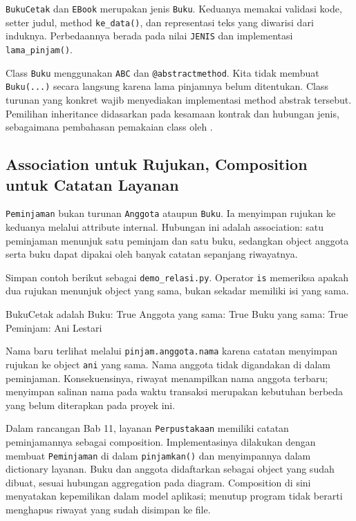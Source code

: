 \texttt{BukuCetak} dan \texttt{EBook} merupakan jenis \texttt{Buku}. Keduanya memakai validasi kode, setter judul, method \texttt{ke\_data()}, dan representasi teks yang diwarisi dari induknya. Perbedaannya berada pada nilai \texttt{JENIS} dan implementasi \texttt{lama\_pinjam()}.

Class \texttt{Buku} menggunakan \texttt{ABC} dan \texttt{@abstractmethod}. Kita tidak membuat \texttt{Buku(...)} secara langsung karena lama pinjamnya belum ditentukan. Class turunan yang konkret wajib menyediakan implementasi method abstrak tersebut. Pemilihan inheritance didasarkan pada kesamaan kontrak dan hubungan jenis, sebagaimana pembahasan pemakaian class oleh \cite{lutz2025learning}.

\subsection{Association untuk Rujukan, Composition untuk Catatan Layanan}

\texttt{Peminjaman} bukan turunan \texttt{Anggota} ataupun \texttt{Buku}. Ia menyimpan rujukan ke keduanya melalui attribute internal. Hubungan ini adalah association: satu peminjaman menunjuk satu peminjam dan satu buku, sedangkan object anggota serta buku dapat dipakai oleh banyak catatan sepanjang riwayatnya.

Simpan contoh berikut sebagai \texttt{demo\_relasi.py}. Operator \texttt{is} memeriksa apakah dua rujukan menunjuk object yang sama, bukan sekadar memiliki isi yang sama.

\begin{kode}
\end{kode}

\begin{keluaran}
BukuCetak adalah Buku: True
Anggota yang sama: True
Buku yang sama: True
Peminjam: Ani Lestari
\end{keluaran}

Nama baru terlihat melalui \texttt{pinjam.anggota.nama} karena catatan menyimpan rujukan ke object \texttt{ani} yang sama. Nama anggota tidak digandakan di dalam peminjaman. Konsekuensinya, riwayat menampilkan nama anggota terbaru; menyimpan salinan nama pada waktu transaksi merupakan kebutuhan berbeda yang belum diterapkan pada proyek ini.

Dalam rancangan Bab 11, layanan \texttt{Perpustakaan} memiliki catatan peminjamannya sebagai composition. Implementasinya dilakukan dengan membuat \texttt{Peminjaman} di dalam \texttt{pinjamkan()} dan menyimpannya dalam dictionary layanan. Buku dan anggota didaftarkan sebagai object yang sudah dibuat, sesuai hubungan aggregation pada diagram. Composition di sini menyatakan kepemilikan dalam model aplikasi; menutup program tidak berarti menghapus riwayat yang sudah disimpan ke file.

